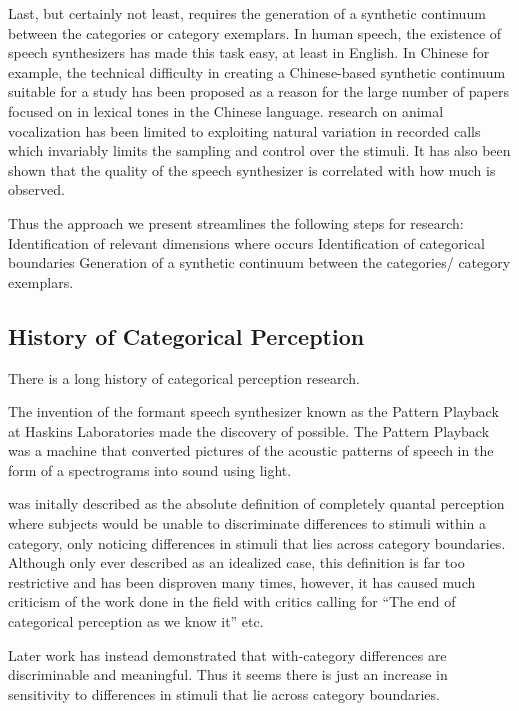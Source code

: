 Last, but certainly not least, \CP requires the generation of a synthetic continuum between the categories or category exemplars. In human speech, the existence of speech synthesizers has made this task easy, at least in English. In Chinese for example, the technical difficulty in creating a Chinese-based synthetic continuum suitable for a \CP study has been proposed as a reason for the large number of papers focused on \CP in lexical tones in the Chinese language\cite{zhang2013categorical}. \CP research on animal vocalization has been limited to exploiting natural variation in recorded calls\cite{swamp sparrow cp} which invariably limits the sampling and control over the stimuli. It has also been shown that the quality of the speech synthesizer is correlated with how much \CP is observed\cite{something}.

Thus the approach we present streamlines the following steps for \CP research:
Identification of relevant dimensions where \CP occurs
Identification of categorical boundaries
Generation of a synthetic continuum between the categories/ category exemplars.

\subsection{History of Categorical Perception}

There is a long history of categorical perception research.

The invention of the formant speech synthesizer known as the Pattern Playback at Haskins Laboratories\cite{patternplayback} made the discovery of \CP possible.
The Pattern Playback was a machine that converted pictures of the acoustic patterns of speech in the form of a spectrograms into sound using light.

\CP was initally described as the absolute definition of completely quantal perception where subjects would be unable to discriminate differences to stimuli within a category, only noticing differences in stimuli that lies across category boundaries\cite{liberman1957discrimination, Studdert1970motor}. Although only ever described as an idealized case, this definition is far too restrictive and has been disproven many times, however, it has caused much criticism of the work done in the \CP field with critics calling for ``The end of categorical perception as we know it''\cite{schouten2003end} etc.

Later work has instead demonstrated that with-category differences are discriminable\cite{pisoni1974reaction,carney1977noncategorical,massaro1983categorical} and meaningful\cite{miller1997internal,mcmurray2002gradient,mcmurray2008gradient}. Thus it seems there is just an increase in sensitivity to differences in stimuli that lie across category boundaries.

